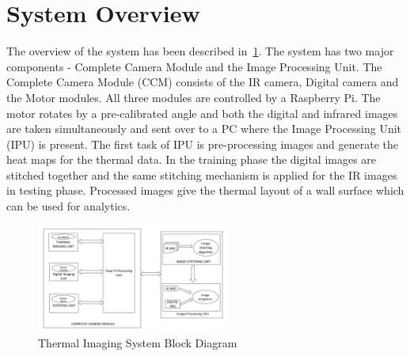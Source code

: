 \section{System Overview}

\indent The overview of the system has been described in~\ref{fig:Overview}. The system has two major components - Complete Camera Module and the Image Processing Unit. The Complete Camera Module (CCM) consists of the IR camera, Digital camera and the Motor modules. All three modules are controlled by a Raspberry Pi. The motor rotates by a pre-calibrated angle and both the digital and infrared images are taken simultaneously and sent over to a PC where the Image Processing Unit (IPU) is present. The first task of IPU is pre-processing images and generate the heat maps for the thermal data. In the training phase the digital images are stitched together and the same stitching mechanism is applied for the IR images in testing phase. Processed images give the thermal layout of a wall surface which can be used for analytics.

\begin{figure}[!h]
\begin{center}
	\includegraphics[width=2.5in]{figs/SystemBlockDIagram.pdf}
\end{center}
  \caption{Thermal Imaging System Block Diagram}
  \label{fig:Overview}
\end{figure}

